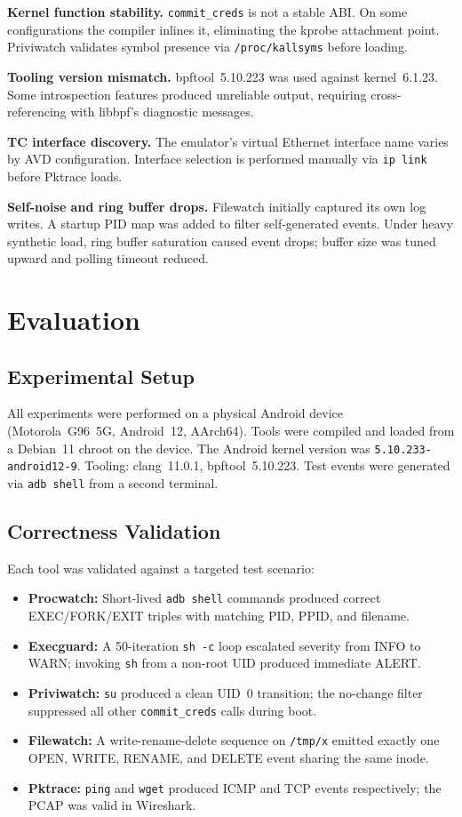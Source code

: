 \documentclass[conference]{IEEEtran}
\begin{document}
\textbf{Kernel function stability.} \texttt{commit\_creds} is not a stable ABI. On some configurations the compiler inlines it, eliminating the kprobe attachment point. Priviwatch validates symbol presence via \texttt{/proc/kallsyms} before loading.

\textbf{Tooling version mismatch.} bpftool~5.10.223 was used against kernel~6.1.23. Some introspection features produced unreliable output, requiring cross-referencing with libbpf's diagnostic messages.

\textbf{TC interface discovery.} The emulator's virtual Ethernet interface name varies by AVD configuration. Interface selection is performed manually via \texttt{ip link} before Pktrace loads.

\textbf{Self-noise and ring buffer drops.} Filewatch initially captured its own log writes. A startup PID map was added to filter self-generated events. Under heavy synthetic load, ring buffer saturation caused event drops; buffer size was tuned upward and polling timeout reduced.

\section{Evaluation}

\subsection{Experimental Setup}
All experiments were performed on a physical Android device (Motorola~G96~5G, Android~12, AArch64). Tools were compiled and loaded from a Debian~11 chroot on the device. The Android kernel version was \texttt{5.10.233-android12-9}. Tooling: clang~11.0.1, bpftool~5.10.223. Test events were generated via \texttt{adb shell} from a second terminal.

\subsection{Correctness Validation}
Each tool was validated against a targeted test scenario:
\begin{itemize}
  \item \textbf{Procwatch:} Short-lived \texttt{adb shell} commands produced correct EXEC/FORK/EXIT triples with matching PID, PPID, and filename.
  \item \textbf{Execguard:} A 50-iteration \texttt{sh -c} loop escalated severity from INFO to WARN; invoking \texttt{sh} from a non-root UID produced immediate ALERT.
  \item \textbf{Priviwatch:} \texttt{su} produced a clean UID~0 transition; the no-change filter suppressed all other \texttt{commit\_creds} calls during boot.
  \item \textbf{Filewatch:} A write-rename-delete sequence on \texttt{/tmp/x} emitted exactly one OPEN, WRITE, RENAME, and DELETE event sharing the same inode.
  \item \textbf{Pktrace:} \texttt{ping} and \texttt{wget} produced ICMP and TCP events respectively; the PCAP was valid in Wireshark.
\end{itemize}
\end{document}
